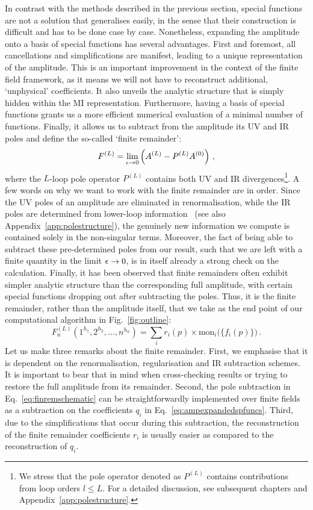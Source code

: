 \documentclass[main.tex]{subfiles}
\begin{document}
In contrast with the methods described in the previous section, special functions are not a solution that generalises easily, in the sense that their construction is difficult and has to be done case by case. Nonetheless, expanding the amplitude onto a basis of special functions has several advantages. First and foremost, all cancellations and simplifications are manifest, leading to a unique representation of the amplitude. This is an important improvement in the context of the finite field framework, as it means we will not have to reconstruct additional, `unphysical' coefficients. It also unveils the analytic structure that is simply hidden within the MI representation. Furthermore, having a basis of special functions grants us a more efficient numerical evaluation of a minimal number of functions. Finally, it allows us to subtract from the amplitude its UV and IR poles and define the so-called `finite remainder':
\begin{equation} \label{eq:finremschematic}
    F^{(L)} = \lim_{\epsilon \to 0} \left( A^{(L)} - P^{(L)} A^{(0)} \right)\,,
\end{equation}
where the $L$-loop pole operator $P^{(L)}$ contains both UV and IR divergences\footnote{We stress that the pole operator denoted as $P^{(L)}$ contains contributions from loop orders $l\le L$. For a detailed discussion, see subsequent chapters and Appendix~\ref{app:polestructure}.}. A few words on why we want to work with the finite remainder are in order. Since the UV poles of an amplitude are eliminated in renormalisation, while the IR poles are determined from lower-loop information~\cite{Catani:1998bh, Becher:2009cu, Becher:2009qa, Gardi:2009qi} (see also Appendix~\ref{app:polestructure}), the genuinely new information we compute is contained solely in the non-singular terms. Moreover, the fact of being able to subtract these pre-determined poles from our result, such that we are left with a finite quantity in the limit $\epsilon \rightarrow 0$, is in itself already a strong check on the calculation. Finally, it has been observed that finite remainders often exhibit simpler analytic structure than the corresponding full amplitude, with certain special functions dropping out after subtracting the poles. Thus, it is the finite remainder, rather than the amplitude itself, that we take as the end point of our computational algorithm in Fig.~\ref{fig:outline}:
\begin{equation}
    F_n^{(L)} \left(1^{h_1}, 2^{h_2}, \ldots, n^{h_n} \right) = \sum_i r_i(p) \times \text{mon}_i \big(\{f_i(p)\}\big)\,.
\end{equation}
Let us make three remarks about the finite remainder. First, we emphasise that it is dependent on the renormalisation, regularisation and IR subtraction schemes. It is important to bear that in mind when cross-checking results or trying to restore the full amplitude from its remainder. Second, the pole subtraction in Eq.~\ref{eq:finremschematic} can be straightforwardly implemented over finite fields as a subtraction on the coefficients $q_i$ in Eq.~\ref{eq:ampexpandedspfuncs}. Third, due to the simplifications that occur during this subtraction, the reconstruction of the finite remainder coefficients $r_i$ is usually easier as compared to the reconstruction of $q_i$.
\end{document}
